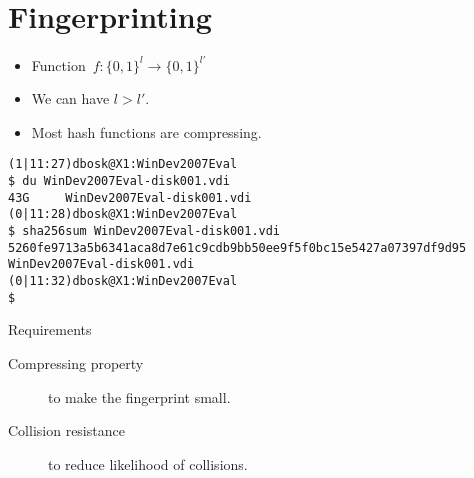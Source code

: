 \mode*




\section{Fingerprinting}

\begin{frame}
  \begin{definition}[Compressing]
    \begin{itemize}
      \item Function~\(f\colon \{0, 1\}^{l}\to \{0, 1\}^{l'}\)
      \item We can have \(l > l'\).
    \end{itemize}
  \end{definition}

  \pause

  \begin{remark}
    \begin{itemize}
      \item Most hash functions are compressing.
    \end{itemize}
  \end{remark}
\end{frame}

\begin{frame}[fragile]
  \begin{example}[Compressing]
    \begin{itemize}
      \begin{verbatim}
(1|11:27)dbosk@X1:WinDev2007Eval
$ du WinDev2007Eval-disk001.vdi
43G     WinDev2007Eval-disk001.vdi
(0|11:28)dbosk@X1:WinDev2007Eval
$ sha256sum WinDev2007Eval-disk001.vdi
5260fe9713a5b6341aca8d7e61c9cdb9bb50ee9f5f0bc15e5427a07397df9d95  WinDev2007Eval-disk001.vdi
(0|11:32)dbosk@X1:WinDev2007Eval
$
      \end{verbatim}
    \end{itemize}
  \end{example}
\end{frame}

\begin{frame}
  \begin{block}{Requirements}
    \begin{description}
      \item[Compressing property] to make the fingerprint small.
      \item[Collision resistance] to reduce likelihood of collisions.
    \end{description}
  \end{block}
\end{frame}

